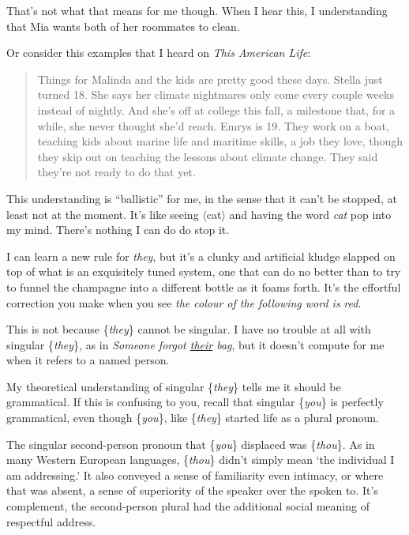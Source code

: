 That's not what that means for me though. When I hear this, I understanding that Mia wants both of her roommates to clean.

Or consider this examples that I heard on \textit{This American Life}:

\begin{quote}
Things for Malinda and the kids are pretty good these days. Stella just turned 18. She says her climate nightmares only come every couple weeks instead of nightly. And she's off at college this fall, a milestone that, for a while, she never thought she'd reach. Emrys is 19. They work on a boat, teaching kids about marine life and maritime skills, a job they love, though they skip out on teaching the lessons about climate change. They said they're not ready to do that yet. \hfill\citep{thisamericanlife_748} 
\end{quote}

This understanding is ``ballistic'' for me, in the sense that it can't be stopped, at least not at the moment. It's like seeing $\langle$cat$\rangle$ and having the word \textit{cat} pop into my mind. There's nothing I can do do stop it.

I can learn a new rule for \textit{they}, but it's a clunky and artificial kludge slapped on top of what is an exquisitely tuned system, one that can do no better than to try to funnel the champagne into a different bottle as it foams forth. It's the effortful correction you make when you see \textit{the colour of the following word is} {\color{blue}\textit{red}}.

This is not because \{\textit{they}\} cannot be singular. I have no trouble at all with singular \{\textit{they}\}, as in 
\textit{Someone forgot \uline{their} bag}, but it doesn't compute for me when it refers to a named person.

My theoretical understanding of singular \{\textit{they}\} tells me it should be grammatical. If this is confusing to you, recall that singular \{\textit{you}\} is perfectly grammatical, even though \{\textit{you}\}, like \{\textit{they}\} started life as a plural pronoun. 

The singular second-person pronoun that \{\textit{you}\} displaced was \{\textit{thou}\}. As in many Western European languages, \{\textit{thou}\} didn't simply mean `the individual I am addressing.' It also conveyed a sense of familiarity even intimacy, or where that was absent, a sense of superiority of the speaker over the spoken to. It's complement, the second-person plural had the additional social meaning of respectful address.

